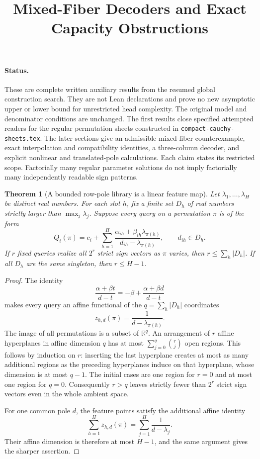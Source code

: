 \documentclass[11pt]{article}
\title{Mixed-Fiber Decoders and Exact Capacity Obstructions}
\author{}
\date{}
\newtheorem{theorem}{Theorem}
\begin{document}
\maketitle

\paragraph{Status.}
These are complete written auxiliary results from the resumed global
construction search. They are not Lean declarations and prove no new
asymptotic upper or lower bound for unrestricted head complexity.
The original model and denominator conditions are unchanged.
The first results close specified attempted readers for the regular
permutation sheets constructed in \texttt{compact-cauchy-sheets.tex}.
The later sections give an admissible mixed-fiber counterexample, exact
interpolation and compatibility identities, a three-column decoder, and
explicit nonlinear and translated-pole calculations. Each claim states
its restricted scope. Factorially many regular parameter solutions do
not imply factorially many independently readable sign patterns.

\begin{theorem}[A bounded row-pole library is a linear feature map]
Let $\lambda_1,\ldots,\lambda_H$ be distinct real numbers. For each
slot $h$, fix a finite set $D_h$ of real numbers strictly larger than
$\max_j\lambda_j$. Suppose every query on a permutation $\pi$ is of
the form
\[
 Q_i(\pi)=c_i+\sum_{h=1}^H
 \frac{\alpha_{ih}+\beta_{ih}\lambda_{\pi(h)}}
      {d_{ih}-\lambda_{\pi(h)}},\qquad d_{ih}\in D_h.
\]
If $r$ fixed queries realize all $2^r$ strict sign vectors as $\pi$
varies, then $r\le\sum_h|D_h|$.
If all $D_h$ are the same singleton, then $r\le H-1$.
\end{theorem}

\begin{proof}
The identity
\[
 \frac{\alpha+\beta t}{d-t}
 =-\beta+\frac{\alpha+\beta d}{d-t}
\]
makes every query an affine functional of the
$q=\sum_h|D_h|$ coordinates
\[
 z_{h,d}(\pi)=\frac1{d-\lambda_{\pi(h)}}.
\]
The image of all permutations is a subset of $\mathbb R^q$.
An arrangement of $r$ affine hyperplanes in affine dimension $q$
has at most $\sum_{j=0}^{q}\binom rj$ open regions. This follows by
induction on $r$: inserting the last hyperplane creates at most as
many additional regions as the preceding hyperplanes induce on that
hyperplane, whose dimension is at most $q-1$. The initial cases are
one region for $r=0$ and at most one region for $q=0$.
Consequently $r>q$ leaves strictly fewer than $2^r$ strict sign
vectors even in the whole ambient space.

For one common pole $d$, the feature points satisfy the additional
affine identity
\[
 \sum_{h=1}^H z_{h,d}(\pi)=\sum_{j=1}^H\frac1{d-\lambda_j}.
\]
Their affine dimension is therefore at most $H-1$, and the same
argument gives the sharper assertion.
\end{proof}
\end{document}
